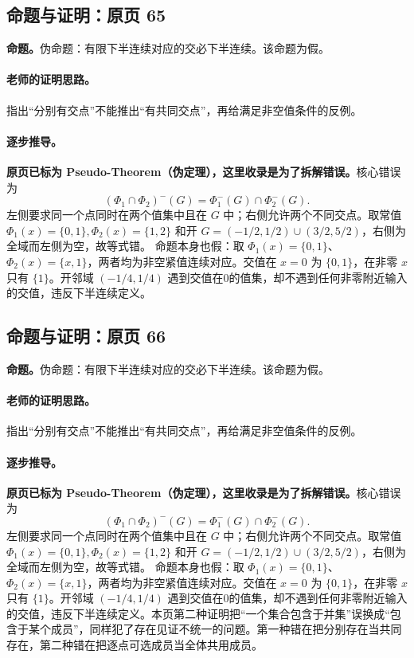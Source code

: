 \subsection{命题与证明：原页 65}

\textbf{命题。}伪命题：有限下半连续对应的交必下半连续。该命题为假。

\paragraph{老师的证明思路。}指出“分别有交点”不能推出“有共同交点”，再给满足非空值条件的反例。

\paragraph{逐步推导。}\textbf{原页已标为 Pseudo-Theorem（伪定理），这里收录是为了拆解错误。}核心错误为
\[(\Phi_1\cap\Phi_2)^-(G)=\Phi_1^-(G)\cap\Phi_2^-(G).\]
左侧要求同一个点同时在两个值集中且在 $G$ 中；右侧允许两个不同交点。取常值 $\Phi_1(x)=\{0,1\},\Phi_2(x)=\{1,2\}$ 和开 $G=(-1/2,1/2)\cup(3/2,5/2)$，右侧为全域而左侧为空，故等式错。
命题本身也假：取 $\Phi_1(x)=\{0,1\}$、$\Phi_2(x)=\{x,1\}$，两者均为非空紧值连续对应。交值在 $x=0$ 为 $\{0,1\}$，在非零 $x$ 只有 $\{1\}$。开邻域 $(-1/4,1/4)$ 遇到交值在0的值集，却不遇到任何非零附近输入的交值，违反下半连续定义。

\subsection{命题与证明：原页 66}

\textbf{命题。}伪命题：有限下半连续对应的交必下半连续。该命题为假。

\paragraph{老师的证明思路。}指出“分别有交点”不能推出“有共同交点”，再给满足非空值条件的反例。

\paragraph{逐步推导。}\textbf{原页已标为 Pseudo-Theorem（伪定理），这里收录是为了拆解错误。}核心错误为
\[(\Phi_1\cap\Phi_2)^-(G)=\Phi_1^-(G)\cap\Phi_2^-(G).\]
左侧要求同一个点同时在两个值集中且在 $G$ 中；右侧允许两个不同交点。取常值 $\Phi_1(x)=\{0,1\},\Phi_2(x)=\{1,2\}$ 和开 $G=(-1/2,1/2)\cup(3/2,5/2)$，右侧为全域而左侧为空，故等式错。
命题本身也假：取 $\Phi_1(x)=\{0,1\}$、$\Phi_2(x)=\{x,1\}$，两者均为非空紧值连续对应。交值在 $x=0$ 为 $\{0,1\}$，在非零 $x$ 只有 $\{1\}$。开邻域 $(-1/4,1/4)$ 遇到交值在0的值集，却不遇到任何非零附近输入的交值，违反下半连续定义。本页第二种证明把“一个集合包含于并集”误换成“包含于某个成员”，同样犯了存在见证不统一的问题。第一种错在把分别存在当共同存在，第二种错在把逐点可选成员当全体共用成员。

